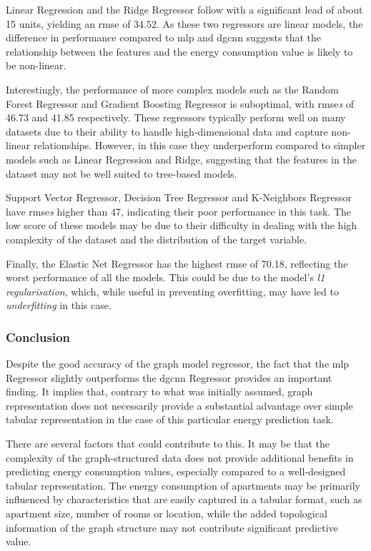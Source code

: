 \documentclass[a4paper, 12pt]{report}
\begin{document}
Linear Regression and the Ridge Regressor follow with a significant lead of about 15 units, yielding an \acrshort{rmse} of 34.52. As these two regressors are linear models, the difference in performance compared to \acrshort{mlp} and \acrshort{dgcnn} suggests that the relationship between the features and the energy consumption value is likely to be non-linear.

Interestingly, the performance of more complex models such as the Random Forest Regressor and Gradient Boosting Regressor is suboptimal, with \acrshort{rmse}\textit{s} of 46.73 and 41.85 respectively. These regressors typically perform well on many datasets due to their ability to handle high-dimensional data and capture non-linear relationships. However, in this case they underperform compared to simpler models such as Linear Regression and Ridge, suggesting that the features in the dataset may not be well suited to tree-based models.

Support Vector Regressor, Decision Tree Regressor and K-Neighbors Regressor have \acrshort{rmse}\textit{s} higher than 47, indicating their poor performance in this task. The low score of these models may be due to their difficulty in dealing with the high complexity of the dataset and the distribution of the target variable.

Finally, the Elastic Net Regressor has the highest \acrshort{rmse} of 70.18, reflecting the worst performance of all the models. This could be due to the model's \textit{l1 regularisation}, which, while useful in preventing \gls{overfitting}, may have led to \textit{\gls{underfitting}} in this case.

\subsubsection{Conclusion}\label{subsubsec:conclusion-regression}

Despite the good accuracy of the graph model regressor, the fact that the \acrshort{mlp} Regressor slightly outperforms the \acrshort{dgcnn} Regressor provides an important finding. It implies that, contrary to what was initially assumed, graph representation does not necessarily provide a substantial advantage over simple tabular representation in the case of this particular energy prediction task.

There are several factors that could contribute to this. It may be that the complexity of the graph-structured data does not provide additional benefits in predicting energy consumption values, especially compared to a well-designed tabular representation. The energy consumption of apartments may be primarily influenced by characteristics that are easily captured in a tabular format, such as apartment size, number of rooms or location, while the added topological information of the graph structure may not contribute significant predictive value.
\end{document}
